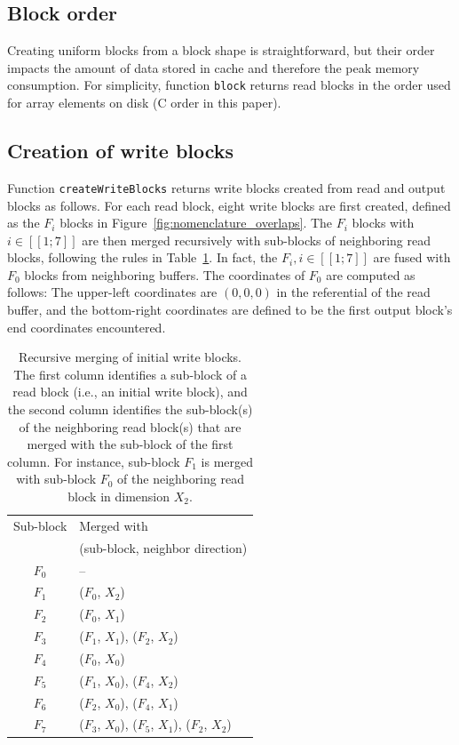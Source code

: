 \documentclass[sigconf, nonacm]{acmart}
\begin{document}
\subsection{Block order}

Creating uniform blocks from a block shape is
straightforward, but their order impacts the amount of data
stored in cache and therefore the peak memory consumption. For
simplicity, function \texttt{block} returns read blocks in the
order used for array elements on disk (C order in this paper).

\subsection{Creation of write blocks}

Function \texttt{createWriteBlocks} returns write blocks created from read and output blocks
as follows. For each read block,
eight write blocks are first created, defined as the $F_i$ blocks in
Figure~\ref{fig:nomenclature_overlaps}.
The $F_i$ blocks with $i \in [\![1;7]\!]$ are then merged
recursively with sub-blocks of neighboring read blocks, following the rules
in Table~\ref{tab:fusion}.
In fact, the $F_i, i \in [\![1;7]\!]$ are fused with $F_0$ blocks from
neighboring buffers.
The coordinates of $F_0$ are computed as follows: The upper-left coordinates are
$(0,0,0)$ in the referential of the read buffer, and the bottom-right coordinates
are defined to be the first output block's end coordinates encountered.

\begin{table}
  \centering
  \caption{Recursive merging of initial write blocks. The first column
  identifies a sub-block of a read block (i.e., an initial write block),
  and the second column identifies the sub-block(s) of the neighboring read
  block(s) that are merged with the sub-block of the first column. For instance, sub-block $F_1$ is merged with sub-block $F_0$
  of the neighboring read block in dimension $X_2$.}
   \begin{tabular}{c|l}
   \rowcolor{black!25}
   Sub-block & Merged with \\
   \rowcolor{black!25}
             & (sub-block, neighbor direction) \\
   $F_0$     & -- \\
   \rowcolor{black!10}
   $F_1$     & ($F_0$, $X_2$) \\
   $F_2$     & ($F_0$, $X_1$) \\
   \rowcolor{black!10}
   $F_3$     & ($F_1$, $X_1$), ($F_2$, $X_2$) \\
   $F_4$     & ($F_0$, $X_0$) \\
   \rowcolor{black!10}
   $F_5$     & ($F_1$, $X_0$), ($F_4$, $X_2$)\\
   $F_6$     & ($F_2$, $X_0$), ($F_4$, $X_1$)\\
   \rowcolor{black!10}
   $F_7$     & ($F_3$, $X_0$), ($F_5$, $X_1$), ($F_2$, $X_2$)\\
   \end{tabular}
   \label{tab:fusion}
\end{table}
\end{document}
